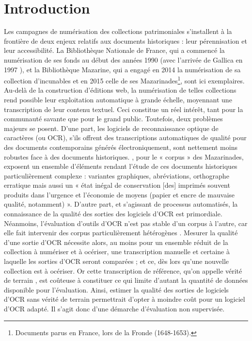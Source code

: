 \documentclass[10pt,twoside]{article}
\begin{document}
\section{Introduction}
Les campagnes de numérisation des collections patrimoniales s'installent à la frontière de deux enjeux relatifs aux 
documents historiques : leur pérennisation et leur accessibilité. La Bibliothèque Nationale de France, qui a commencé la 
numérisation de ses fonds au début des années 1990 (avec l'arrivée de Gallica en 1997 \cite{Bermes2020a}), et la Bibliothèque Mazarine, 
qui a engagé en 2014 la numérisation de sa collection d'incunables et en 2015 celle de ses Mazarinades\footnote{Documents parus en France, lors de la Fronde (1648-1653).}, sont ici exemplaires. 
Au-delà de la construction d'éditions web, la numérisation de telles collections rend possible leur exploitation automatique 
à grande échelle, moyennant une transcription de leur contenu textuel. Ceci constitue un réel intérêt, tant pour la communauté
savante que pour le grand public. Toutefois, deux problèmes majeurs se posent. D'une part, les logiciels 
de reconnaissance optique de caractères (ou OCR), s'ils offrent des transcriptions automatiques de qualité pour des 
documents contemporains générés électroniquement, sont nettement moins robustes face à des documents historiques. 
\cite{Lejeune2019a}, pour le « corpus » des Mazarinades,
exposent un ensemble d'éléments rendant l'étude de ces documents historiques particulièrement complexe : variantes graphiques,
abréviations, orthographe erratique mais aussi un « état inégal de conservation [des] imprimés souvent produits dans l’urgence et l’économie de moyens (papier et encre de mauvaise qualité, notamment) ». D'autre part, et s'agissant de
processus automatisés, la connaissance de la qualité des sorties des logiciels d'OCR est primordiale. Néanmoins, l'évaluation
d'outils d'OCR n'est pas stable d'un corpus à l'autre, car elle fait intervenir des corpus particulièrement hétérogènes
\cite{Springmann2014a}. Mesurer la qualité d'une sortie d'OCR nécessite alors, au moins pour un ensemble réduit de la 
collection à numériser et à océriser, une transcription manuelle et certaine à laquelle les sorties d'OCR seront comparées ; 
et ce, dès lors qu'une nouvelle collection est à océriser. Or cette transcription de référence, qu'on appelle vérité de terrain \cite{Springmann2018a}, est coûteuse à constituer ce 
qui limite d'autant la quantité de données disponible pour l'évaluation. Ainsi, estimer la qualité des sorties de logiciels 
d'OCR sans vérité de terrain permettrait d'opter à moindre coût pour un logiciel d'OCR adapté. Il s'agit donc 
d'une démarche d'évaluation non supervisée.
\end{document}
